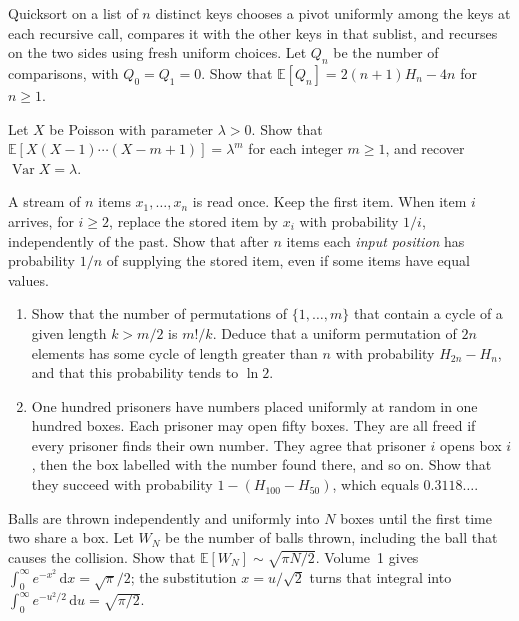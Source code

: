 \begin{exercise}[$\star\star$]\label{ex:quicksort}
Quicksort on a list of $n$ distinct keys chooses a pivot uniformly among the keys at each recursive call, compares it with the other keys in that sublist, and recurses on the two sides using fresh uniform choices. Let $Q_n$ be the number of comparisons, with $Q_0=Q_1=0$. Show that $\mathbb E[Q_n]=2(n+1)H_n-4n$ for $n\ge1$.
\end{exercise}

\begin{exercise}[$\star\star$]\label{ex:factorial}
Let $X$ be Poisson with parameter $\lambda>0$. Show that $\mathbb E[X(X-1)\cdots(X-m+1)]=\lambda^m$ for each integer $m\ge1$, and recover $\operatorname{Var}X=\lambda$.
\end{exercise}

\begin{exercise}[$\star\star$]\label{ex:reservoir}
A stream of $n$ items $x_1,\ldots,x_n$ is read once. Keep the first item. When item $i$ arrives, for $i\ge2$, replace the stored item by $x_i$ with probability $1/i$, independently of the past. Show that after $n$ items each \emph{input position} has probability $1/n$ of supplying the stored item, even if some items have equal values.
\end{exercise}

\begin{exercise}[$\star\star$]\label{ex:prisoners}
\begin{enumerate}[label=(\alph*)]
\item Show that the number of permutations of $\{1,\ldots,m\}$ that contain a cycle of a given length $k>m/2$ is $m!/k$. Deduce that a uniform permutation of $2n$ elements has some cycle of length greater than $n$ with probability $H_{2n}-H_n$, and that this probability tends to $\ln2$.
\item One hundred prisoners have numbers placed uniformly at random in one hundred boxes. Each prisoner may open fifty boxes. They are all freed if every prisoner finds their own number. They agree that prisoner $i$ opens box $i$, then the box labelled with the number found there, and so on. Show that they succeed with probability $1-(H_{100}-H_{50})$, which equals $0.3118\ldots$.
\end{enumerate}
\end{exercise}

\begin{exercise}[$\star\star\star$]\label{ex:birthdaywait}
Balls are thrown independently and uniformly into $N$ boxes until the first time two share a box. Let $W_N$ be the number of balls thrown, including the ball that causes the collision. Show that $\mathbb E[W_N]\sim\sqrt{\pi N/2}$. Volume~1 gives $\int_0^\infty e^{-x^2}\,\mathrm dx=\sqrt\pi/2$; the substitution $x=u/\sqrt2$ turns that integral into $\int_0^\infty e^{-u^2/2}\,\mathrm du=\sqrt{\pi/2}$.
\end{exercise}

